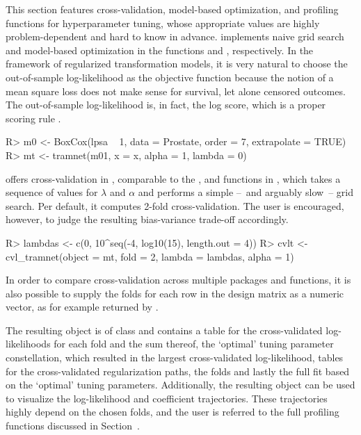 This section features cross-validation, model-based optimization, and profiling functions
for hyperparameter tuning, whose appropriate values are highly problem-dependent
and hard to know in advance.  implements naive grid search and model-based
optimization in the functions  and , respectively.
In the framework of regularized transformation models, it is very natural to choose
the out-of-sample log-likelihood as the objective function because
the notion of a mean square loss does not make sense for survival, let alone
censored outcomes. The out-of-sample log-likelihood is, in fact, the log score,
which is a proper scoring rule \citep{Gneiting_Raftery_2007}.
\begin{example}
R> m0 <- BoxCox(lpsa ~ 1, data = Prostate, order = 7, extrapolate = TRUE)
R> mt <- tramnet(m01, x = x, alpha = 1, lambda = 0)
\end{example}
 offers cross-validation in , comparable to the
, and  functions in , which takes a sequence
of values for $\lambda$ and $\alpha$ and performs a simple --~and arguably slow~--
grid search. Per default, it computes 2-fold cross-validation. The user is encouraged,
however, to judge the resulting bias-variance trade-off accordingly.
\begin{example}
R> lambdas <- c(0, 10^seq(-4, log10(15), length.out = 4))
R> cvlt <- cvl_tramnet(object = mt, fold = 2, lambda = lambdas, alpha = 1)
\end{example}
In order to compare cross-validation across multiple packages and functions, it
is also possible to supply the folds for each row in the design matrix as a
numeric vector, as for example returned by .
The resulting object is of class  and contains a table for the
cross-validated log-likelihoods for each fold and the sum thereof, the `optimal'
tuning parameter constellation, which resulted in the largest cross-validated
log-likelihood, tables for the cross-validated regularization paths, the
folds and lastly the full fit based on the `optimal' tuning parameters. Additionally,
the resulting object can be used to visualize the log-likelihood and coefficient
trajectories. These trajectories highly depend on the chosen folds, and the user
is referred to the full profiling functions discussed in Section~.

